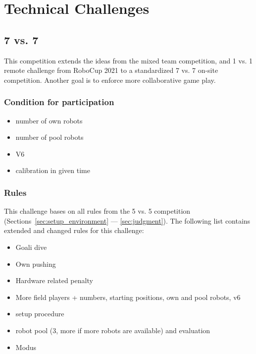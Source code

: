 \section{Technical Challenges}

\subsection{7 vs. 7}
    This competition extends the ideas from the mixed team competition, and 1 vs. 1 remote challenge from RoboCup 2021 to a standardized 7 vs. 7 on-site competition. Another goal is to enforce more collaborative game play.

    \subsubsection{Condition for participation} %
        \begin{itemize}
            \item number of own robots
            \item number of pool robots
            \item V6
            \item calibration in given time
        \end{itemize}

    \subsubsection{Rules}
        This challenge bases on all rules from the 5 vs. 5 competition (Sections~\ref{sec:setup_environment} — \ref{sec:judgment}). The following list contains extended and changed rules for this challenge:

        \begin{itemize}
            \item Goali dive %
            \item Own pushing %
            \item Hardware related penalty %
            \item More field players + numbers, starting positions, own and pool robots, v6 %
            \item setup procedure %
            \item robot pool (3, more if more robots are available) and evaluation %
            \item Modus %
        \end{itemize}


